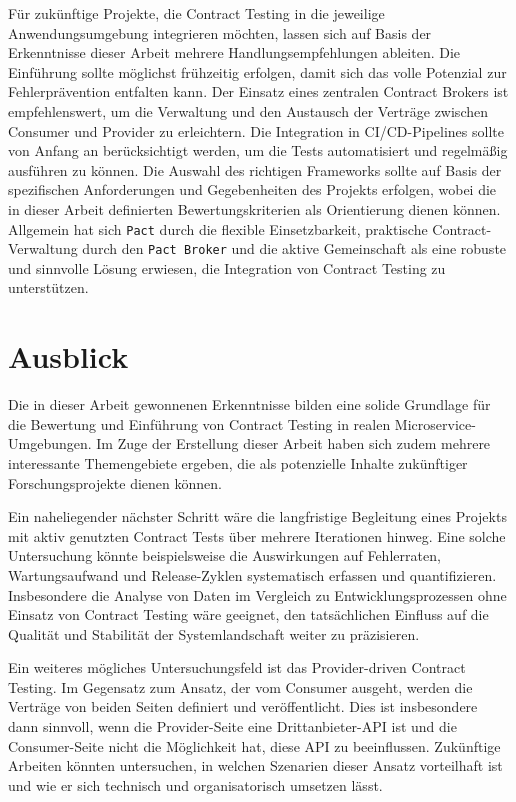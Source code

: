 Für zukünftige Projekte, die Contract Testing in die jeweilige Anwendungsumgebung integrieren möchten, lassen sich auf Basis der Erkenntnisse dieser Arbeit mehrere Handlungsempfehlungen ableiten.
Die Einführung sollte möglichst frühzeitig erfolgen, damit sich das volle Potenzial zur Fehlerprävention entfalten kann.
Der Einsatz eines zentralen Contract Brokers ist empfehlenswert, um die Verwaltung und den Austausch der Verträge zwischen Consumer und Provider zu erleichtern.
Die Integration in \gls{CI}/\gls{CD}-\glspl{Pipeline} sollte von Anfang an berücksichtigt werden, um die Tests automatisiert und regelmäßig ausführen zu können.
Die Auswahl des richtigen Frameworks sollte auf Basis der spezifischen Anforderungen und Gegebenheiten des Projekts erfolgen, wobei die in dieser Arbeit definierten Bewertungskriterien als Orientierung dienen können.
Allgemein hat sich \texttt{Pact} durch die flexible Einsetzbarkeit, praktische Contract-Verwaltung durch den \texttt{Pact Broker} und die aktive Gemeinschaft als eine robuste und sinnvolle Lösung erwiesen, die Integration von Contract Testing zu unterstützen.

\section{Ausblick}\label{sec:summary_outlook}

Die in dieser Arbeit gewonnenen Erkenntnisse bilden eine solide Grundlage für die Bewertung und Einführung von Contract Testing in realen Microservice-Umgebungen.
Im Zuge der Erstellung dieser Arbeit haben sich zudem mehrere interessante Themengebiete ergeben, die als potenzielle Inhalte zukünftiger Forschungsprojekte dienen können.

Ein naheliegender nächster Schritt wäre die langfristige Begleitung eines Projekts mit aktiv genutzten Contract Tests über mehrere Iterationen hinweg.
Eine solche Untersuchung könnte beispielsweise die Auswirkungen auf Fehlerraten, Wartungsaufwand und Release-Zyklen systematisch erfassen und quantifizieren.
Insbesondere die Analyse von Daten im Vergleich zu Entwicklungsprozessen ohne Einsatz von Contract Testing wäre geeignet, den tatsächlichen Einfluss auf die Qualität und Stabilität der Systemlandschaft weiter zu präzisieren.

Ein weiteres mögliches Untersuchungsfeld ist das Provider-driven Contract Testing.
Im Gegensatz zum Ansatz, der vom Consumer ausgeht, werden die Verträge von beiden Seiten definiert und veröffentlicht.
Dies ist insbesondere dann sinnvoll, wenn die Provider-Seite eine Drittanbieter-\gls{API} ist und die Consumer-Seite nicht die Möglichkeit hat, diese \gls{API} zu beeinflussen.
Zukünftige Arbeiten könnten untersuchen, in welchen Szenarien dieser Ansatz vorteilhaft ist und wie er sich technisch und organisatorisch umsetzen lässt.

